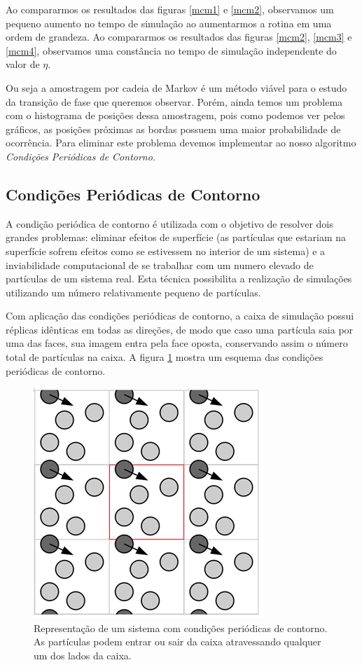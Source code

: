 \documentclass[%
reprint,
amsmath,amssymb,
aps,
12pt
]{revtex4-1}
\begin{document}
\newpage
Ao compararmos os resultados das figuras \ref{mcm1} e \ref{mcm2}, observamos um pequeno aumento no tempo de simulação ao aumentarmos a rotina em uma ordem de grandeza. Ao compararmos os resultados das figuras \ref{mcm2}, \ref{mcm3} e \ref{mcm4}, observamos uma constância no tempo de simulação independente do valor de $ \eta $. 

Ou seja a amostragem por cadeia de Markov é um método viável para o estudo da transição de fase que queremos observar. Porém, ainda temos um problema com o histograma de posições dessa amostragem, pois como podemos ver pelos gráficos, as posições próximas as bordas possuem uma maior probabilidade de ocorrência. Para eliminar este problema devemos implementar ao nosso algoritmo \textit{Condições Periódicas de Contorno}.

\subsection{Condições Periódicas de Contorno}

A condição periódica de contorno é utilizada com o objetivo de resolver dois grandes problemas: eliminar efeitos de superfície (as partículas que estariam na superfície sofrem efeitos como se estivessem no interior de um sistema) e a inviabilidade computacional de se trabalhar com um numero elevado de partículas de um sistema real. Esta técnica possibilita a realização de simulações utilizando um número relativamente pequeno de partículas.

Com aplicação das condições periódicas de contorno, a caixa de simulação possui réplicas idênticas em todas as direções, de modo que caso uma partícula saia por uma das faces, sua imagem entra pela face oposta, conservando assim o número total de partículas na caixa. A figura \ref{cpc} mostra um esquema das condições periódicas de contorno.

\begin{figure}[!h]
	\centering
	\includegraphics[scale=0.7]{cpc.png}
	\caption{Representação de um sistema com condições periódicas de contorno. As partículas podem entrar ou sair da caixa atravessando qualquer um dos lados da caixa.
		\label{cpc}}
\end{figure}
\end{document}
